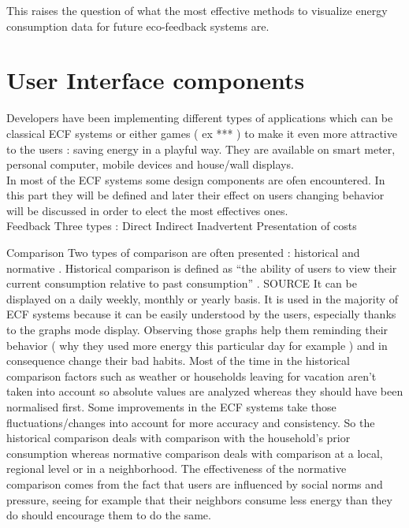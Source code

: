 \documentclass[journal]{vgtc}                %
\begin{document}
This raises the question of what the most effective methods to visualize energy consumption data for future eco-feedback systems are. 


\section{User Interface components}
Developers have been implementing different types of applications which can be classical ECF systems or either games ( ex *** ) to make it even more attractive to the users : saving energy in a playful way.
They are available on smart meter, personal computer, mobile devices and house/wall displays. \\


In most of the ECF systems some design components are ofen encountered.
In this part they will be defined and later their effect on users changing behavior will be discussed in order to elect the most effectives ones. \\

Feedback
Three types : Direct
Indirect
Inadvertent
Presentation of costs

Comparison 
Two types of comparison are often presented : historical and normative .
Historical comparison is defined as  “the ability of users to view their current consumption relative to past consumption” . SOURCE
It can be displayed on a daily weekly, monthly or yearly basis. It is used in the majority of ECF systems because it can be easily understood by the users, especially thanks to the graphs mode display. Observing those graphs help them reminding their behavior ( why they used more energy this particular day for example ) and in consequence change their bad habits.
Most of the time in the historical comparison factors such as weather or households leaving for vacation aren't taken into account so absolute values are analyzed whereas they should have been normalised first. Some improvements in the ECF systems take those fluctuations/changes into account for more accuracy and consistency.
So the historical comparison deals with comparison with the household's prior consumption whereas normative comparison deals with comparison at a local, regional level or in a neighborhood. The effectiveness of the normative comparison comes from the fact that users are influenced by social norms and pressure, seeing for example that their neighbors consume less energy than they do should encourage them to do the same.
\end{document}
